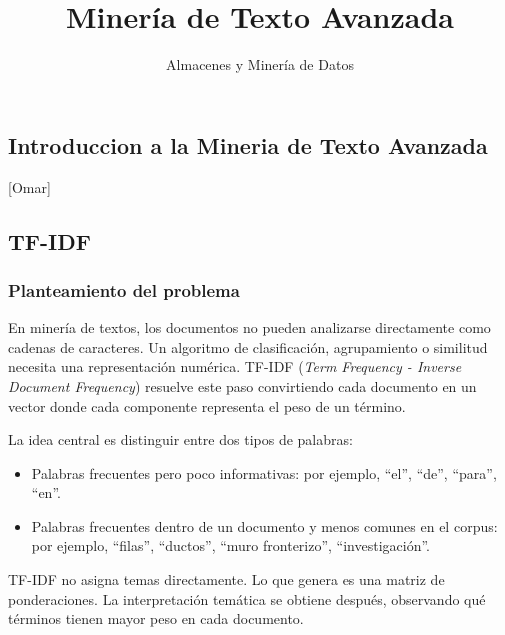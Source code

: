 \documentclass[
  spanish,
  letterpaper,
  DIV=11,
  numbers=noendperiod]{scrartcl}
\title{Minería de Texto Avanzada}
\author{Almacenes y Minería de Datos}
\date{}
\providecommand{\tightlist}{%
  \setlength{\itemsep}{0pt}\setlength{\parskip}{0pt}}
\begin{document}
\maketitle


\subsection{Introduccion a la Mineria de Texto
Avanzada}\label{introduccion-a-la-mineria-de-texto-avanzada}

{[}Omar{]}

\subsection{TF-IDF}\label{tf-idf}

\subsubsection{Planteamiento del
problema}\label{planteamiento-del-problema}

En minería de textos, los documentos no pueden analizarse directamente
como cadenas de caracteres. Un algoritmo de clasificación, agrupamiento
o similitud necesita una representación numérica. TF-IDF (\emph{Term
Frequency - Inverse Document Frequency}) resuelve este paso convirtiendo
cada documento en un vector donde cada componente representa el peso de
un término.

La idea central es distinguir entre dos tipos de palabras:

\begin{itemize}
\tightlist
\item
  Palabras frecuentes pero poco informativas: por ejemplo, ``el'',
  ``de'', ``para'', ``en''.
\item
  Palabras frecuentes dentro de un documento y menos comunes en el
  corpus: por ejemplo, ``filas'', ``ductos'', ``muro fronterizo'',
  ``investigación''.
\end{itemize}

\begin{tcolorbox}[enhanced jigsaw, breakable, rightrule=.15mm, leftrule=.75mm, opacityback=0, arc=.35mm, colframe=quarto-callout-note-color-frame, toprule=.15mm, left=2mm, colback=white, bottomrule=.15mm]

TF-IDF no asigna temas directamente. Lo que genera es una matriz de
ponderaciones. La interpretación temática se obtiene después, observando
qué términos tienen mayor peso en cada documento.

\end{tcolorbox}
\end{document}
